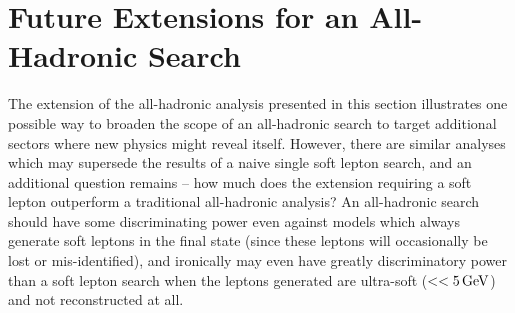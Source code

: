 \section{Future Extensions for an All-Hadronic Search}
\label{sec:future}

The extension of the all-hadronic analysis presented in this section illustrates one possible way to broaden the scope of an all-hadronic search to target additional sectors where new physics might reveal itself. However, there are similar analyses which may supersede the results of a naive single soft lepton search, and an additional question remains -- how much does the extension requiring a soft lepton outperform a traditional all-hadronic analysis? An all-hadronic search should have some discriminating power even against models which always generate soft leptons in the final state (since these leptons will occasionally be lost or mis-identified), and ironically may even have greatly discriminatory power than a soft lepton search when the leptons generated are ultra-soft (\pt $<<5\,\text{Ge\hspace{-.08em}V}$) and not reconstructed at all.

